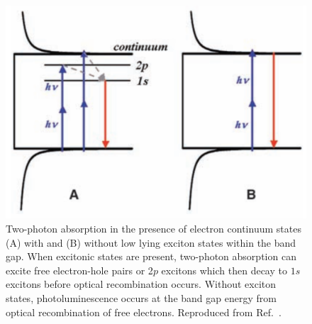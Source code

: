 \begin{figure}[H]
	\centering
	\includegraphics[scale=0.3]{images/chapter_optical_props/cnt_two_photon}
	\caption{ Two-photon absorption in the presence of electron continuum states (A) with and (B) without low lying exciton states within the band gap. When excitonic states are present, two-photon absorption can excite free electron-hole pairs or 2$p$ excitons which then decay to $1s$ excitons before optical recombination occurs. Without exciton states, photoluminescence occurs at the band gap energy from optical recombination of free electrons. Reproduced from Ref.\ \cite{wang2005optical}. }
	\label{fig:cnt_two_photon}
\end{figure}


